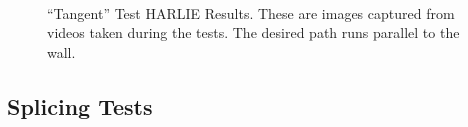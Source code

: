 \begin{figure}
\centering
{}
\\
\caption[``Tangent'' Test HARLIE Results]{``Tangent'' Test HARLIE Results. These are images captured from videos taken during the tests. The desired path runs parallel to the wall.}
\label{fig:tangent_skill_harlie_results}
\end{figure}

\subsection{Splicing Tests}\label{subsec:splicing_tests}

